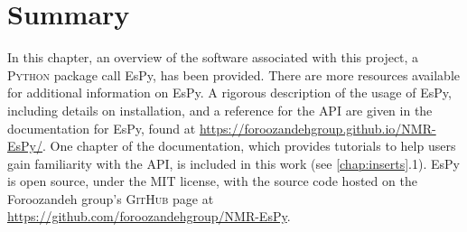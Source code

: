 \section{Summary}
In this chapter, an overview of the software associated with this project, a
\textsc{Python} package call \ac{EsPy}, has been provided.
There are more resources available for additional information on \ac{EsPy}. A rigorous
description of the usage of \ac{EsPy}, including details on installation, and a
reference for the \ac{API} are given in the documentation for \ac{EsPy}, found
at \url{https://foroozandehgroup.github.io/NMR-EsPy/}.
One chapter of the documentation, which provides tutorials to help users gain
familiarity with the \ac{API}, is included in this work (see \cref{chap:inserts}.1).
\ac{EsPy} is open source, under the \textsc{MIT} license, with the source code
hosted on the Foroozandeh group's \textsc{GitHub} page at
\url{https://github.com/foroozandehgroup/NMR-EsPy}.
